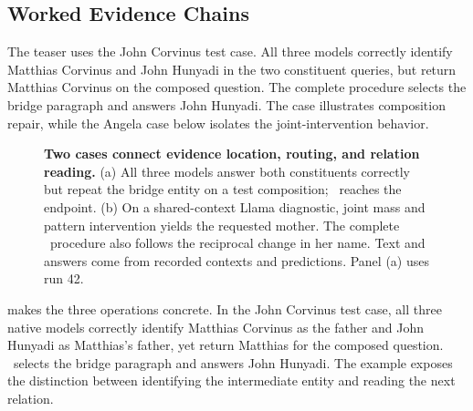 \begin{table}[!htbp]
  \centering
  \caption{\textbf{MMLU generation and subject-macro diagnostics.} Results on all 14,042 test questions. Generated-letter accuracy evaluates the emitted A/B/C/D answer; valid format requires an accepted option-only response followed by EOS. Macro metrics average over subjects. Option-macro accuracy uses the same first-token option probabilities as the primary micro metric in \cref{tab:capability_full}. All values are percentages, averaged across recorded runs; Native is measured once.}
  \label{tab:mmlu_generation}
  \small\setlength{\tabcolsep}{4pt}
  
\end{table}

\subsection{Worked Evidence Chains}
\label{app:cases}

The teaser uses the John Corvinus test case. All three models correctly identify Matthias Corvinus and John Hunyadi in the two constituent queries, but return Matthias Corvinus on the composed question. The complete procedure selects the bridge paragraph and answers John Hunyadi. The case illustrates composition repair, while the Angela case below isolates the joint-intervention behavior.

\begin{figure}[!htbp]
  \centering
  \begin{minipage}{1\textwidth}\centering
  \par
  \caption{\textbf{Two cases connect evidence location, routing, and relation reading.} (a) All three models answer both constituents correctly but repeat the bridge entity on a test composition; \method\ reaches the endpoint. (b) On a shared-context Llama diagnostic, joint mass and pattern intervention yields the requested mother. The complete \method\ procedure also follows the reciprocal change in her name. Text and answers come from recorded contexts and predictions. Panel (a) uses run 42.}
  \label{fig:mechanism_cases}
\end{minipage}
\end{figure}

 makes the three operations concrete. In the John Corvinus test case, all three native models correctly identify Matthias Corvinus as the father and John Hunyadi as Matthias's father, yet return Matthias for the composed question. \method\ selects the bridge paragraph and answers John Hunyadi. The example exposes the distinction between identifying the intermediate entity and reading the next relation.

